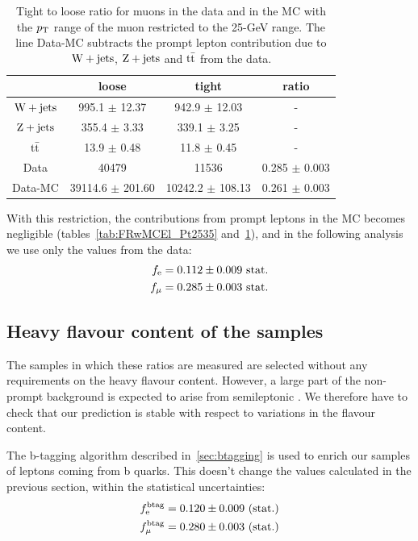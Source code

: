 \begin{table}[htb]
    \centering
\begin{tabular}{*4c}
    \toprule
 & 	 loose & 	 tight & 	 ratio \\
 \midrule
$\mathrm{W} + \text{jets}$ & 	995.1 $\pm$ 12.37 & 	942.9 $\pm$ 12.03 & 	- \\
$\mathrm{Z} + \text{jets}$ & 	355.4 $\pm$ 3.33 & 	339.1 $\pm$ 3.25 & 	- \\
$\mathrm{t}\bar{\mathrm{t}}$ & 	13.9 $\pm$ 0.48 & 	11.8 $\pm$ 0.45 & 	- \\
\midrule
Data & 	40479 & 	11536 & 	0.285 $\pm$ 0.003 \\
Data-MC &	39114.6 $\pm$ 201.60 & 	10242.2 $\pm$ 108.13 & 	0.261 $\pm$ 0.003 \\
\bottomrule
\end{tabular}
\caption{Tight to loose ratio for muons in the data and in the MC with the
    $p_\mathrm{T}$ range of the muon restricted to the 25-\unit[35]{GeV} range. 
The line Data-MC subtracts the prompt lepton contribution due to $\mathrm{W} + \text{jets}$,
$\mathrm{Z} + \text{jets}$ and $\mathrm{t}\bar{\mathrm{t}}$ from the data.}
\label{tab:FRwMCMu_Pt2535}
\end{table}

With this \pt restriction, the contributions from prompt leptons in the MC
becomes negligible (tables~\ref{tab:FRwMCEl_Pt2535}
and~\ref{tab:FRwMCMu_Pt2535}), and in the following analysis we use only the values
from the data:
\begin{align*}
    f_{\mathrm{e}} &= 0.112 \pm 0.009 \text{ stat.}\\
    f_{\mu} &= 0.285 \pm 0.003 \text{ stat.}
\end{align*}

\subsection{Heavy flavour content of the samples}
The samples in which these ratios are measured are selected without any
requirements on the heavy flavour content. However, a large part of the
non-prompt background is expected to arise from semileptonic \ttbar. We
therefore have to check that our prediction is stable with respect to
variations in the flavour content.

The b-tagging algorithm described in~\ref{sec:btagging} is used to enrich
our samples of leptons coming from b quarks. This doesn't change the values
calculated in the previous section, within the statistical uncertainties:
\begin{align*}
    f_{\mathrm{e}}^{\text{btag}} &= 0.120 \pm 0.009 \text{ (stat.)}\\
    f_{\mu}^{\text{btag}} &= 0.280 \pm 0.003 \text{ (stat.)}
\end{align*}


